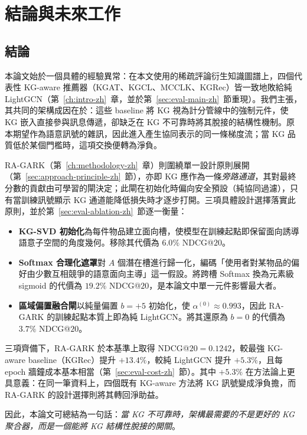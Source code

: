 \chapter{結論與未來工作}
\label{ch:conclusion-zh}

\section{結論}
\label{sec:conclude-main-zh}

本論文始於一個具體的經驗異常：在本文使用的稀疏評論衍生知識圖譜上，四個代表性 KG-aware 推薦器（KGAT、KGCL、MCCLK、KGRec）皆一致地敗給純 LightGCN（第~\ref{ch:intro-zh}~章，並於第~\ref{sec:eval-main-zh}~節重現）。我們主張，其共同的架構成因在於：這些 baseline 將 KG 視為計分管線中的強制元件，使 KG 嵌入直接參與訊息傳遞，卻缺乏在 KG 不可靠時將其脫接的結構性機制。原本期望作為語意訊號的雜訊，因此進入產生協同表示的同一條梯度流；當 KG 品質低於某個門檻時，這項交換便轉為淨負。

RA-GARK（第~\ref{ch:methodology-zh}~章）則圍繞單一設計原則展開（第~\ref{sec:approach-principle-zh}~節），亦即 KG 應作為一條\emph{旁路通道}，其對最終分數的貢獻由可學習的閘決定；此閘在初始化時偏向安全預設（純協同過濾），只有當訓練訊號顯示 KG 通道能降低損失時才逐步打開。三項具體設計選擇落實此原則，並於第~\ref{sec:eval-ablation-zh}~節逐一衡量：

\begin{itemize}
  \item \textbf{KG-SVD 初始化}為每件物品建立面向槽，使模型在訓練起點即保留面向誘導語意子空間的角度幾何。移除其代價為 $6.0\%$ NDCG@$20$。
  \item \textbf{Softmax 合理化遮罩}對 $A$ 個潛在槽進行歸一化，編碼「使用者對某物品的偏好由少數互相競爭的語意面向主導」這一假設。將跨槽 Softmax 換為元素級 sigmoid 的代價為 $19.2\%$ NDCG@$20$，是本論文中單一元件影響最大者。
  \item \textbf{區域偏置融合閘}以純量偏置 $b = +5$ 初始化，使 $\alpha^{(0)} \approx 0.993$，因此 RA-GARK 的訓練起點本質上即為純 LightGCN。將其還原為 $b = 0$ 的代價為 $3.7\%$ NDCG@$20$。
\end{itemize}

三項齊備下，RA-GARK 於本基準上取得 NDCG@$20 = 0.1242$，較最強 KG-aware baseline（KGRec）提升 $+13.4\%$，較純 LightGCN 提升 $+5.3\%$，且每 epoch 牆鐘成本基本相當（第~\ref{sec:eval-cost-zh}~節）。其中 $+5.3\%$ 在方法論上更具意義：在同一筆資料上，四個既有 KG-aware 方法將 KG 訊號變成淨負擔，而 RA-GARK 的設計選擇則將其轉回淨助益。

因此，本論文可總結為一句話：\emph{當 KG 不可靠時，架構最需要的不是更好的 KG 聚合器，而是一個能將 KG 結構性脫接的開關}。

